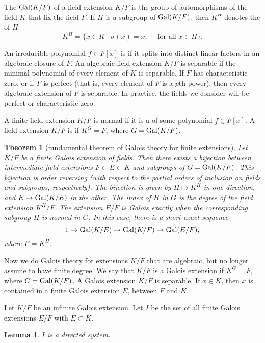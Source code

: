 \documentclass{amsart}
\newtheorem{theorem}[equation]{Theorem}
\newtheorem{lemma}[equation]{Lemma}
\begin{document}
The  ${\operatorname{Gal}}(K/F)$
of a field extension $K/F$ is the group of automorphisms
of the field $K$ that fix the field $F$.   If $H$ is a subgroup of
${\operatorname{Gal}}(K/F)$, then $K^H$ denotes the  of $H$:
\[
K^H= \{x \in K \mid \sigma(x) = x,\quad \text{ for all } x\in H\}.
\]


An irreducible polynomial $f\in F[x]$ is  if it splits
into distinct linear factors in an algebraic closure of $F$.
An algebraic field extension $K/F$ is separable if the minimal polynomial
of every element of $K$ is separable.  If $F$ has characteristic zero, or
if $F$ is perfect (that is, every element of $F$ is a $p$th power), then
every algebraic extension of $F$ is separable.  In practice, the fields
we consider will be perfect or characteristic zero.

A finite field extension $K/F$ is normal if it is a  of
some polynomial $f\in F[x]$.
A field extension $K/F$ is  if $K^G = F$, where $G={\operatorname{Gal}}(K/F)$.

\begin{theorem}[fundamental theorem of Galois theory for finite extensions]  
Let $K/F$ be a finite Galois extension of fields.
Then there exists a bijection between intermediate field extensions
$F\subset E\subset K$ and subgroups of $G={\operatorname{Gal}}(K/F)$.  This bijection
is order reversing (with respect to the partial orders of inclusion
on fields and subgroups, respectively).  The bijection is given by
$H\mapsto K^H$ in one direction, and $E\mapsto {\operatorname{Gal}}(K/E)$ in the
other.   The index of $H$ in $G$ is the degree of the field extension $K^H/F$.
The extension $E/F$ is Galois exactly when the corresponding
subgroup $H$ is normal in $G$.  In this case, there is a short exact sequence
\[
1 \to {\operatorname{Gal}}(K/E) \to {\operatorname{Gal}}(K/F) \to {\operatorname{Gal}}(E/F),
\]
where $E=K^H$.
\end{theorem}

Now we do Galois theory for extensions $K/F$ that are algebraic, but no longer
assume to have finite degree.  We say that $K/F$ is a Galois extension if
$K^G = F$, where $G={\operatorname{Gal}}(K/F)$.  A Galois extension $K/F$ is separable.
If $x\in K$, then $x$ is contained in a finite Galois extension $E$, between $F$ and $K$.

Let $K/F$ be an infinite Galois extension.  Let $I$ be the set of all finite
Galois extensions $E/F$ with $E\subset K$.

\begin{lemma} $I$ is a directed system.  
\end{lemma}
\end{document}
